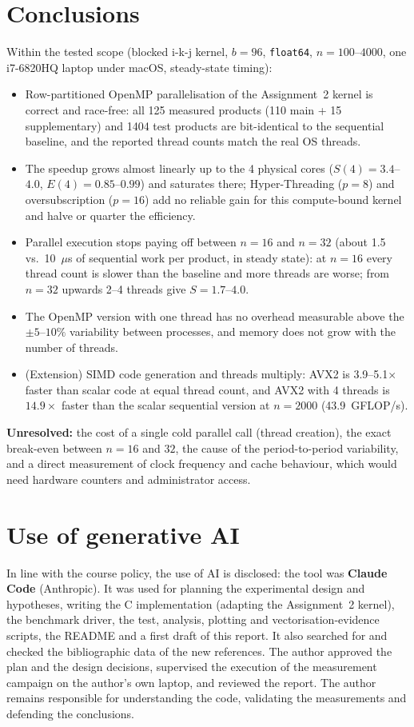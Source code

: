 \section{Conclusions}
Within the tested scope (blocked i-k-j kernel, $b=96$, \texttt{float64}, $n=100$--$4000$, one i7-6820HQ laptop under macOS, steady-state timing):
\begin{itemize}
\item Row-partitioned OpenMP parallelisation of the Assignment~2 kernel is correct and race-free: all 125 measured products (110 main + 15 supplementary) and 1404 test products are
bit-identical to the sequential baseline, and the reported thread counts match the real OS threads.
\item The speedup grows almost linearly up to the 4 physical cores ($S(4)=3.4$--$4.0$, $E(4)=0.85$--$0.99$) and saturates there; Hyper-Threading
($p=8$) and oversubscription ($p=16$) add no reliable gain for this compute-bound kernel and halve or quarter the efficiency.
\item Parallel execution stops paying off between $n=16$ and $n=32$ (about 1.5 vs.\ 10~$\mu$s of sequential work per product, in steady state):
at $n=16$ every thread count is slower than the baseline and more threads are worse; from $n=32$ upwards 2--4 threads give $S=1.7$--$4.0$.
\item The OpenMP version with one thread has no overhead measurable above the $\pm5$--$10\%$ variability between processes, and memory does not grow with the
number of threads.
\item (Extension) SIMD code generation and threads multiply: AVX2 is 3.9--5.1$\times$ faster than scalar code at equal thread count, and AVX2 with
4 threads is $14.9\times$ faster than the scalar sequential version at $n=2000$ (43.9~GFLOP/s).
\end{itemize}
\textbf{Unresolved:} the cost of a single cold parallel call (thread creation), the exact break-even between $n=16$ and $32$, the cause of the
period-to-period variability, and a direct measurement of clock frequency and cache behaviour, which would need hardware counters and administrator access.

\section{Use of generative AI}
In line with the course policy, the use of AI is disclosed: the tool was \textbf{Claude Code} (Anthropic). It was used for planning the experimental
design and hypotheses, writing the C implementation (adapting the Assignment~2 kernel), the benchmark driver, the test, analysis, plotting and
vectorisation-evidence scripts, the README and a first draft of this report. It also searched for and checked the bibliographic
data of the new references. The author approved the plan and the design decisions, supervised the execution of the measurement campaign on the author's own laptop, and
reviewed the report. The author remains responsible for understanding the code, validating the measurements and defending
the conclusions.

